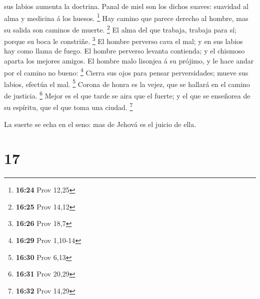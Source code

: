 sus labios aumenta la doctrina.  Panal de miel son los
dichos suaves: suavidad al alma y medicina á los huesos. \footnote{\textbf{16:24}
  Prov 12,25}  Hay camino que parece derecho al hombre, mas
su salida son caminos de muerte. \footnote{\textbf{16:25} Prov 14,12}
 El alma del que trabaja, trabaja para sí; porque su boca
le constriñe. \footnote{\textbf{16:26} Prov 18,7}  El
hombre perverso cava el mal; y en sus labios hay como llama de fuego.
 El hombre perverso levanta contienda; y el chismoso aparta
los mejores amigos.  El hombre malo lisonjea á su prójimo,
y le hace andar por el camino no bueno: \footnote{\textbf{16:29} Prov
  1,10-14}  Cierra sus ojos para pensar perversidades;
mueve sus labios, efectúa el mal. \footnote{\textbf{16:30} Prov 6,13}
 Corona de honra es la vejez, que se hallará en el camino
de justicia. \footnote{\textbf{16:31} Prov 20,29}  Mejor es
el que tarde se aira que el fuerte; y el que se enseñorea de su
espíritu, que el que toma una ciudad. \footnote{\textbf{16:32} Prov
  14,29}

 La suerte se echa en el seno: mas de Jehová es el juicio
de ella.

\hypertarget{section-16}{%
\section{17}\label{section-16}}


